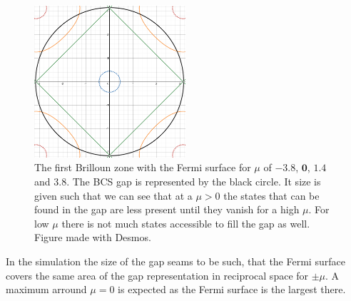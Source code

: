 \documentclass[..\main.tex]{subfile}
\begin{document}
\begin{figure}[H]
  \centering
  \includegraphics[width=0.5\textwidth]{Ressources/GapBrillouin.png}
  \caption{The first Brilloun zone with the Fermi surface for $\mu$ of \textcolor{Brillou1}{$\bm{-3.8}$}, \textcolor{Brillou2}{$\bm{0}$},
  \textcolor{Brillou3}{$\bm{1.4}$} and \textcolor{Brillou4}{$\bm{3.8}$}. The BCS gap is represented by the black circle. It size is given such that 
  we can see that at a $\mu>0$ the states that can be found in the gap are less present until they vanish for a high $\mu$. For low $\mu$ there is
  not much states accessible to fill the gap as well. Figure made with Desmos.}
  \label{fig:Brillouin}
\end{figure}
In the simulation the size of the gap seams to be such, that the Fermi surface 
covers the same area of the gap representation in reciprocal space for $\pm\mu$.
A maximum arround $\mu=0$ is expected as the Fermi surface is the largest there.   
\end{document}
